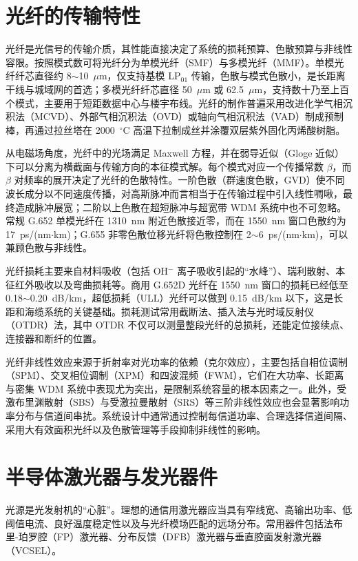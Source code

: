 \documentclass[a4paper,11pt,UTF8,fontset=fandol]{ctexart}
\begin{document}
\section{光纤的传输特性}

光纤是光信号的传输介质，其性能直接决定了系统的损耗预算、色散预算与非线性容限。按照模式数可将光纤分为单模光纤（SMF）与多模光纤（MMF）。单模光纤纤芯直径约 8$\sim$10~$\mu$m，仅支持基模 LP$_{01}$ 传输，色散与模式色散小，是长距离干线与城域网的首选；多模光纤纤芯直径 50~$\mu$m 或 62.5~$\mu$m，支持数十乃至上百个模式，主要用于短距数据中心与楼宇布线\cite{yuanrong2020}。光纤的制作普遍采用改进化学气相沉积法（MCVD）、外部气相沉积法（OVD）或轴向气相沉积法（VAD）制成预制棒，再通过拉丝塔在 2000~$^{\circ}$C 高温下拉制成丝并涂覆双层紫外固化丙烯酸树脂。

从电磁场角度，光纤中的光场满足 Maxwell 方程，并在弱导近似（Gloge 近似）下可以分离为横截面与传输方向的本征模式解。每个模式对应一个传播常数 $\beta$，而 $\beta$ 对频率的展开决定了光纤的色散特性。一阶色散（群速度色散，GVD）使不同波长成分以不同速度传播，对高斯脉冲而言相当于在传输过程中引入线性啁啾，最终造成脉冲展宽；二阶以上色散在超短脉冲与超宽带 WDM 系统中也不可忽略。常规 G.652 单模光纤在 1310~nm 附近色散接近零，而在 1550~nm 窗口色散约为 17~ps/(nm$\cdot$km)；G.655 非零色散位移光纤将色散控制在 2$\sim$6~ps/(nm$\cdot$km)，可以兼顾色散与非线性\cite{agrawal2010,yuanrong2020}。

光纤损耗主要来自材料吸收（包括 OH$^-$ 离子吸收引起的“水峰”）、瑞利散射、本征红外吸收以及弯曲损耗等。商用 G.652D 光纤在 1550~nm 窗口的损耗已经低至 0.18$\sim$0.20~dB/km，超低损耗（ULL）光纤可以做到 0.15~dB/km 以下，这是长距和海缆系统的关键基础。损耗测试常用截断法、插入法与光时域反射仪（OTDR）法，其中 OTDR 不仅可以测量整段光纤的总损耗，还能定位接续点、连接器和断纤的位置。

光纤非线性效应来源于折射率对光功率的依赖（克尔效应），主要包括自相位调制（SPM）、交叉相位调制（XPM）和四波混频（FWM），它们在大功率、长距离与密集 WDM 系统中表现尤为突出，是限制系统容量的根本因素之一\cite{agrawal2013nonlinear}。此外，受激布里渊散射（SBS）与受激拉曼散射（SRS）等三阶非线性效应也会显著影响功率分布与信道间串扰。系统设计中通常通过控制每信道功率、合理选择信道间隔、采用大有效面积光纤以及色散管理等手段抑制非线性的影响。

\section{半导体激光器与发光器件}

光源是光发射机的“心脏”。理想的通信用激光器应当具有窄线宽、高输出功率、低阈值电流、良好温度稳定性以及与光纤模场匹配的远场分布。常用器件包括法布里-珀罗腔（FP）激光器、分布反馈（DFB）激光器与垂直腔面发射激光器（VCSEL）\cite{yuanrong2020}。
\end{document}
